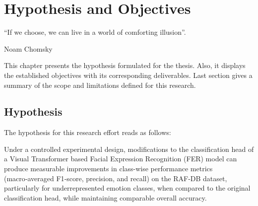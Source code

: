 \chapter{Hypothesis and Objectives}
\label{chapter:hypothesis-objectives}
\epigraph{``If we choose, we can live in a world of comforting illusion''.}{\vspace{10pt}Noam Chomsky}

\newpage

This chapter presents the hypothesis formulated for the thesis. Also, it displays the established objectives with its corresponding deliverables. Last section gives a summary of the scope and limitations defined for this research.

\section{Hypothesis}
\label{section:hypothesis}



The hypothesis for this research effort reads as follows:




Under a controlled experimental design, modifications to the classification head of a Visual Transformer based Facial Expression Recognition (\gls{FER}) model can produce measurable improvements in class-wise performance metrics (macro‑averaged F1‑score, precision, and recall) on the RAF‑DB dataset, particularly for underrepresented emotion classes, when compared to the original classification head, while maintaining comparable overall accuracy.

